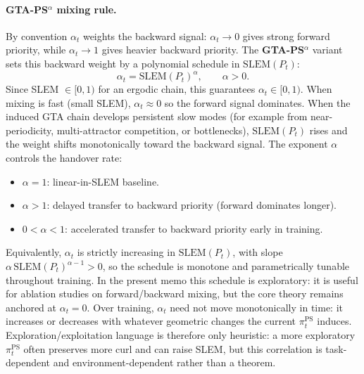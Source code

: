 \documentclass[10pt,a4paper]{article}
\begin{document}
\paragraph{GTA-PS$^{\alpha}$ mixing rule.}
By convention $\alpha_t$ weights the backward signal:
$\alpha_t \rightarrow 0$ gives strong forward priority, while $\alpha_t \rightarrow 1$ gives heavier backward
priority. The \textbf{GTA-PS$^{\alpha}$} variant sets this backward weight by a
polynomial schedule in $\mathrm{SLEM}(P_t)$:
\[
  \alpha_t = \mathrm{SLEM}(P_t)^{\alpha}, \qquad \alpha > 0.
\]
Since SLEM $\in [0,1)$ for an ergodic chain, this guarantees
$\alpha_t \in [0,1)$.  When mixing is fast (small SLEM), $\alpha_t \approx 0$ so the
forward signal dominates.  When the induced GTA chain develops persistent slow modes
(for example from near-periodicity, multi-attractor competition, or bottlenecks),
$\mathrm{SLEM}(P_t)$ rises and the weight shifts monotonically toward
the backward signal.  The exponent $\alpha$ controls the
handover rate:
\begin{itemize}\setlength\itemsep{1pt}
  \item $\alpha = 1$: linear-in-SLEM baseline.
  \item $\alpha > 1$: delayed transfer to backward priority (forward dominates longer).
  \item $0 < \alpha < 1$: accelerated transfer to backward priority early in training.
\end{itemize}
Equivalently, $\alpha_t$ is strictly increasing in $\mathrm{SLEM}(P_t)$, with slope
$\alpha\,\mathrm{SLEM}(P_t)^{\alpha-1} > 0$, so the schedule is monotone and parametrically tunable
throughout training.
In the present memo this schedule is exploratory: it is useful for ablation studies on forward/backward mixing, but the core theory remains anchored at $\alpha_t=0$.
Over training, $\alpha_t$ need not move monotonically in time: it increases or decreases with
whatever geometric changes the current $\pi_t^{\mathrm{PS}}$ induces.
Exploration/exploitation language is therefore only heuristic: a more exploratory
$\pi_t^{\mathrm{PS}}$ often preserves more curl and can raise SLEM, but this correlation is
task-dependent and environment-dependent rather than a theorem.
\end{document}
